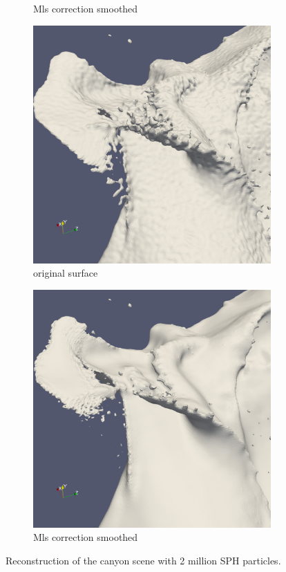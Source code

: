 \begin{figure}
\begin{center}
\begin{subfigure}[b]{0.47\textwidth}
			\caption{Mls correction smoothed}
		\end{subfigure}
		\begin{subfigure}[b]{0.47\textwidth}
			\includegraphics[width=\textwidth]{figures/CanionOriginal2.png}
			\caption{original surface}
		\end{subfigure}
		\begin{subfigure}[b]{0.47\textwidth}
			\includegraphics[width=\textwidth]{figures/CanionMls2.png}
			\caption{Mls correction smoothed}
			\label{fig:canion_small_features}
		\end{subfigure}
	\end{center}
	\caption{Reconstruction of the canyon scene with 2 million SPH particles.} \label{fig:db_mls_reconstruction3}
\end{figure}
